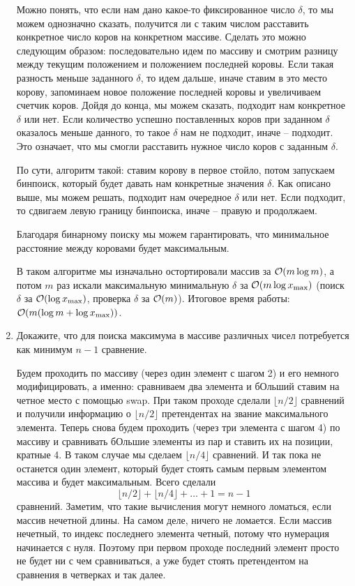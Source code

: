 \begin{enumerate}
\begin{solution}
		Можно понять, что если нам дано какое-то фиксированное число $\delta$, то мы можем однозначно сказать, получится ли с таким числом расставить конкретное число коров на конкретном массиве. Сделать это можно следующим образом: последовательно идем по массиву и смотрим разницу между текущим положением и положением последней коровы. Если такая разность меньше заданного $\delta$, то идем дальше, иначе ставим в это место корову, запоминаем новое положение последней коровы и увеличиваем счетчик коров. Дойдя до конца, мы можем сказать, подходит нам конкретное $\delta$ или нет. Если количество успешно поставленных коров при заданном $\delta$ оказалось меньше данного, то такое $\delta$ нам не подходит, иначе -- подходит. Это означает, что мы смогли расставить нужное число коров с заданным $\delta$.

		По сути, алгоритм такой: ставим корову в первое стойло, потом запускаем бинпоиск, который будет давать нам конкретные значения $\delta$. Как описано выше, мы можем решать, подходит нам очередное $\delta$ или нет. Если подходит, то сдвигаем левую границу бинпоиска, иначе -- правую и продолжаем.

		Благодаря бинарному поиску мы можем гарантировать, что минимальное расстояние между коровами будет максимальным.

		В таком алгоритме мы изначально остортировали массив за $\mathcal{O}(m \log m)$, а потом $m$ раз искали максимальную минимальную $\delta$ за $\mathcal{O}(m \log{x_{\max}})$ (поиск $\delta$ за $\mathcal{O}(\log{x_{\max}})$, проверка $\delta$ за $\mathcal{O}(m)$). Итоговое время работы: $\mathcal{O}(m (\log{m} + \log{x_{\max}}))$.
	\end{solution}

  \item
    Докажите, что для поиска максимума в массиве различных чисел потребуется
	как минимум $n-1$ сравнение.
	\begin{solution}
		Будем проходить по массиву (через один элемент с шагом 2) и его немного модифицировать, а именно: сравниваем два элемента и бОльший ставим на четное место с помощью swap. При таком проходе сделали $\lfloor n/2 \rfloor$ сравнений и получили информацию о $\lfloor n/2 \rfloor$ претендентах на звание максимального элемента. Теперь снова будем проходить (через три элемента с шагом 4) по массиву и сравнивать бОльшие элементы из пар и ставить их на позиции, кратные 4. В таком случае мы сделаем $\lfloor n/4 \rfloor$ сравнений. И так пока не останется один элемент, который будет стоять самым первым элементом массива и будет максимальным. Всего сделали
		\begin{equation}
			\lfloor n/2 \rfloor + \lfloor n/4 \rfloor + \ldots + 1 = n - 1
		\end{equation}
		сравнений. Заметим, что такие вычисления могут немного ломаться, если массив нечетной длины. На самом деле, ничего не ломается. Если массив нечетный, то индекс последнего элемента четный, потому что нумерация начинается с нуля. Поэтому при первом проходе последний элемент просто не будет ни с чем сравниваться, а уже будет стоять претендентом на сравнения в четверках и так далее.
	\end{solution}
	


\end{enumerate}
